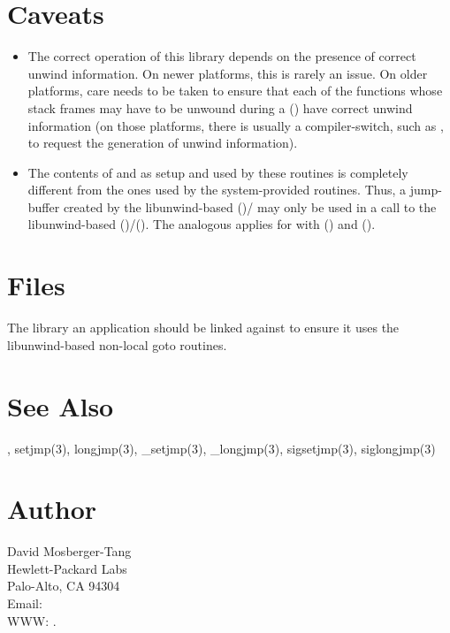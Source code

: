 \documentclass{article}
\begin{document}
\section{Caveats}

\begin{itemize}
\item The correct operation of this library depends on the presence of
  correct unwind information.  On newer platforms, this is rarely an
  issue.  On older platforms, care needs to be taken to
  ensure that each of the functions whose stack frames may have to be
  unwound during a () have correct unwind information
  (on those platforms, there is usually a compiler-switch, such as
  , to request the generation of unwind
  information).
\item The contents of  and  as setup
  and used by these routines is completely different from the ones
  used by the system-provided routines.  Thus, a jump-buffer created
  by the libunwind-based ()/ may only be
  used in a call to the libunwind-based
  ()/().  The analogous applies for
   with () and ().
\end{itemize}

\section{Files}

\begin{Description}
\item[\Opt{-l}\File{unwind-setjmp}] The library an application should
  be linked against to ensure it uses the libunwind-based non-local
  goto routines.
\end{Description}


\section{See Also}

,
setjmp(3), longjmp(3),
\_setjmp(3), \_longjmp(3),
sigsetjmp(3), siglongjmp(3)

\section{Author}

\noindent
David Mosberger-Tang\\
Hewlett-Packard Labs\\
Palo-Alto, CA 94304\\
Email: \\
WWW: .
\LatexManEnd
\end{document}
